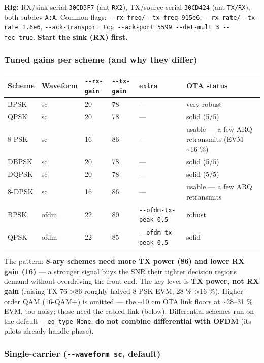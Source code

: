 \documentclass[
  10pt,
]{article}
\begin{document}
\textbf{Rig:} RX/sink serial \texttt{30CD3F7} (ant \texttt{RX2}),
TX/source serial \texttt{30CD424} (ant \texttt{TX/RX}), both subdev
\texttt{A:A}. Common flags: \texttt{-\/-rx-freq/-\/-tx-freq\ 915e6},
\texttt{-\/-rx-rate/-\/-tx-rate\ 1.6e6},
\texttt{-\/-ack-transport\ tcp\ -\/-ack-port\ 5599\ -\/-det-mult\ 3\ -\/-fec\ true}.
\textbf{Start the sink (RX) first.}

\hypertarget{tuned-gains-per-scheme-and-why-they-differ}{%
\subsubsection{Tuned gains per scheme (and why they
differ)}\label{tuned-gains-per-scheme-and-why-they-differ}}

\begin{longtable}[]{@{}llllll@{}}
\toprule
Scheme & Waveform & \texttt{-\/-rx-gain} & \texttt{-\/-tx-gain} & extra
& OTA status \\
\midrule
\endhead
BPSK & sc & 20 & 78 & --- & very robust \\
QPSK & sc & 20 & 78 & --- & solid (5/5) \\
8-PSK & sc & 16 & 86 & --- & usable --- a few ARQ retransmits (EVM
\textasciitilde16 \%) \\
DBPSK & sc & 20 & 78 & --- & solid (5/5) \\
DQPSK & sc & 20 & 78 & --- & solid (5/5) \\
8-DPSK & sc & 16 & 86 & --- & usable --- a few ARQ retransmits \\
BPSK & ofdm & 22 & 80 & \texttt{-\/-ofdm-tx-peak\ 0.5} & robust \\
QPSK & ofdm & 22 & 85 & \texttt{-\/-ofdm-tx-peak\ 0.5} & solid \\
\bottomrule
\end{longtable}

The pattern: \textbf{8-ary schemes need more TX power (86) and lower RX
gain (16)} --- a stronger signal buys the SNR their tighter decision
regions demand without overdriving the front end. The key lever is
\textbf{TX power, not RX gain} (raising TX 76-\textgreater86 roughly
halved 8-PSK EVM, 28 \%-\textgreater16 \%). Higher-order QAM (16-QAM+)
is omitted --- the \textasciitilde10 cm OTA link floors at
\textasciitilde28--31 \% EVM, too noisy; those need the cabled link
(below). Differential schemes run on the default
\texttt{-\/-eq\_type\ None}; \textbf{do not combine differential with
OFDM} (its pilots already handle phase).

\hypertarget{single-carrier---waveform-sc-default}{%
\subsubsection{\texorpdfstring{Single-carrier
(\texttt{-\/-waveform\ sc},
default)}{Single-carrier (-\/-waveform sc, default)}}\label{single-carrier---waveform-sc-default}}
\end{document}
